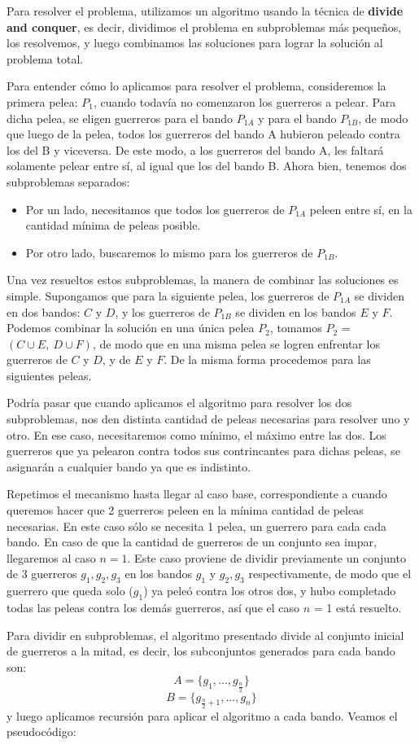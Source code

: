 \par Para resolver el problema, utilizamos un algoritmo usando la técnica de \textbf{divide and conquer}, es decir, dividimos el problema en subproblemas más pequeños, los resolvemos, y luego combinamos las soluciones para lograr la solución al problema total. 
\par Para entender cómo lo aplicamos para resolver el problema, consideremos la primera pelea: $P_1$, cuando todavía no comenzaron los guerreros a pelear. Para dicha pelea, se eligen guerreros para el bando $P_{1A}$ y para el bando $P_{1B}$, de modo que luego de la pelea, todos los guerreros del bando A hubieron peleado contra los del B y viceversa. De este modo, a los guerreros del bando A, les faltará solamente pelear entre sí, al igual que los del bando B. Ahora bien, tenemos dos subproblemas separados: 
\begin{itemize}
\item Por un lado, necesitamos que todos los guerreros de $P_{1A}$ peleen entre sí, en la cantidad mínima de peleas posible.
\item Por otro lado, buscaremos lo mismo para los guerreros de $P_{1B}$.
\end{itemize}
\par Una vez resueltos estos subproblemas, la manera de combinar las soluciones es simple. Supongamos que para la siguiente pelea, los guerreros de $P_{1A}$ se dividen en dos bandos: $C$ y $D$, y los guerreros de $P_{1B}$ se dividen en los bandos $E$ y $F$. Podemos combinar la solución en una única pelea $P_2$, tomamos $P_2$ = $(C \cup E,\ D \cup F)$, de modo que en una misma pelea se logren enfrentar los guerreros de $C$ y $D$, y de $E$ y $F$. De la misma forma procedemos para las siguientes peleas.
\par Podría pasar que cuando aplicamos el algoritmo para resolver los dos subproblemas, nos den distinta cantidad de peleas necesarias para resolver uno y otro. En ese caso, necesitaremos como mínimo, el máximo entre las dos. Los guerreros que ya pelearon contra todos sus contrincantes para dichas peleas, se asignarán a cualquier bando ya que es indistinto.
\par Repetimos el mecanismo hasta llegar al caso base, correspondiente a cuando queremos hacer que 2 guerreros peleen en la mínima cantidad de peleas necesarias. En  este caso sólo se necesita 1 pelea, un guerrero para cada cada bando. En caso de que la cantidad de guerreros de un conjunto sea impar, llegaremos al caso $n=1$. Este caso proviene de dividir previamente un conjunto de 3 guerreros $g_1, g_2, g_3$ en los bandos $g_1$ y  $g_2, g_3$ respectivamente, de modo que el guerrero que queda solo ($g_1$) ya peleó contra los otros dos, y hubo completado todas las peleas contra los demás guerreros, así que el caso $n$ = 1 está resuelto.
\par Para dividir en subproblemas, el algoritmo presentado divide al conjunto inicial de guerreros a la mitad, es decir, los subconjuntos generados para cada bando son:
\[A = \{g_1,...,g_{\frac{n}{2}}\}\] 
\[B = \{g_{\frac{n}{2}+1},...,g_n\}\]
y luego aplicamos recursión para aplicar el algoritmo a cada bando. Veamos el pseudocódigo:


